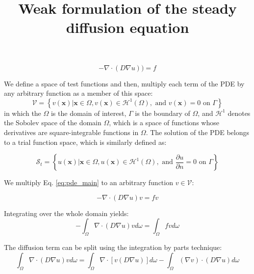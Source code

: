 \documentclass[12pt,a4paper]{article}
\title{Weak formulation of the steady diffusion equation}
\date{}
\begin{document}
\maketitle

\onehalfspacing

\begin{equation} \label{eq:pde_main}
-\nabla \cdot\left(D \nabla u\right))=f
\end{equation}

\noindent We define a space of test functions and then, multiply each term of the PDE by any arbitrary function as a member of this space:
\begin{equation} \label{eq:function_space}
\mathcal{V}=\left\{v(\mathbf{x}) | \mathbf{x} \in {\Omega}, v(\mathbf{x}) \in \mathcal{H}^{1}(\Omega), \text { and } v(\mathbf{x})=0 \text { on } \Gamma\right\}
\end{equation}
in which the $\Omega$ is the domain of interest, $\Gamma$ is the boundary of $\Omega$, and $\mathcal{H}^{1}$ denotes the Sobolev space of the domain $\Omega$, which is a space of functions whose derivatives are square-integrable functions in $\Omega$. The solution of the PDE belongs to a trial function space, which is similarly defined as:

\begin{equation} \label{eq:trial_domain}
\mathcal{S}_{t}=\left\{u(\mathbf{x}) | \mathbf{x} \in \Omega, u(\mathbf{x}) \in \mathcal{H}^{1}(\Omega), \text { and } \frac{\partial u}{\partial n}=0 \text { on } \Gamma\right\}
\end{equation}

\noindent We multiply Eq. \ref{eq:pde_main} to an arbitrary function $v \in \mathcal{V}$:

\begin{equation}
-\nabla \cdot\left(D \nabla u\right)v=fv
\end{equation}

\noindent Integrating over the whole domain yields:
\begin{equation} \label{eq:int_first}
-\int_{\Omega} \nabla \cdot (D  \nabla u) v d \omega=\int_{\Omega} f v d \omega
\end{equation}

\noindent The diffusion term can be split using the integration by parts technique:
\begin{equation} \label{eq:int_part}
\int_{\Omega} \nabla \cdot (D  \nabla u) v d \omega = \int_{\Omega} \nabla \cdot[v(D  \nabla u)] d \omega-\int_{\Omega} (\nabla v) \cdot(D \nabla u) d \omega
\end{equation}
\end{document}
